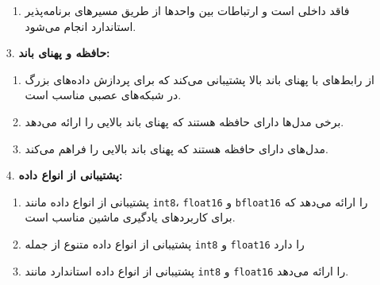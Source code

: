 \begin{qsolve}
\begin{enumerate}
\begin{enumerate}
			
			\item 
			 فاقد  داخلی است و ارتباطات بین واحدها از طریق مسیرهای برنامه‌پذیر استاندارد  انجام می‌شود.
		\end{enumerate}
		
		
		\item [3.]
		\textbf{حافظه و پهنای باند:}
		\begin{enumerate}
			\item 
			 از رابط‌های  با پهنای باند بالا پشتیبانی می‌کند که برای پردازش داده‌های بزرگ در شبکه‌های عصبی مناسب است. \cite{ref7}
			
			\item 
			 برخی مدل‌ها دارای حافظه  هستند که پهنای باند بالایی را ارائه می‌دهد. 
			
			\item 
			 مدل‌های  دارای حافظه  هستند که پهنای باند بالایی را فراهم می‌کند. 
		\end{enumerate}
	\end{enumerate}
\end{qsolve}


\begin{qsolve}
	\begin{enumerate}
		\item [4.]
		\textbf{پشتیبانی از انواع داده:}
		\begin{enumerate}
			\item 
			 پشتیبانی از انواع داده مانند \texttt{int8}، \texttt{float16} و \texttt{bfloat16} را ارائه می‌دهد که برای کاربردهای یادگیری ماشین مناسب است. 
			
			
			\item {}
			پشتیبانی از انواع داده متنوع از جمله \texttt{int8} و \texttt{float16} را دارد
			
			\item {}
			پشتیبانی از انواع داده استاندارد مانند \texttt{int8} و \texttt{float16} را ارائه می‌دهد.
		\end{enumerate}
	\end{enumerate}
\end{qsolve}






